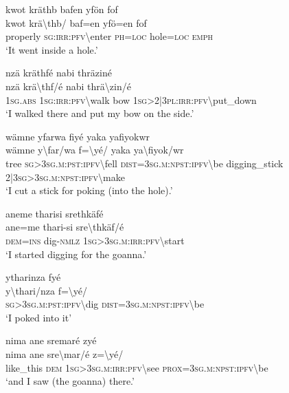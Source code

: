 \ea\label{ex:13:a1312}
kwot kräthb bafen yfön fof\\
\gll kwot	krä{\textbackslash}thb/	baf=en	yfö=en	fof\\
     properly	\textsc{sg}:\textsc{irr}:\textsc{pfv}{\textbackslash}enter	\textsc{ph}=\textsc{loc}	hole=\textsc{loc}	\textsc{emph}\\
\glt `It went inside a hole.'
\z

\ea\label{ex:13:a1313}
nzä kräthfé nabi thräziné\\
\gll nzä	krä{\textbackslash}thf/é	nabi	thrä{\textbackslash}zin/é\\
     1\textsc{sg}.\textsc{abs}	1\textsc{sg}:\textsc{irr}:\textsc{pfv}{\textbackslash}walk	bow	1\textsc{sg}>2|3\textsc{pl}:\textsc{irr}:\textsc{pfv}{\textbackslash}put\_down\\
\glt `I walked there and put my bow on the side.'
\z

\ea\label{ex:13:a1314}
wämne yfarwa fiyé yaka yafiyokwr\\
\gll wämne	y{\textbackslash}far/wa	f={\textbackslash}yé/	yaka	ya{\textbackslash}fiyok/wr\\
     tree	\textsc{sg}>3\textsc{sg}.\textsc{m}:\textsc{pst}:\textsc{ipfv}{\textbackslash}fell	\textsc{dist}=3\textsc{sg}.\textsc{m}:\textsc{npst}:\textsc{ipfv}{\textbackslash}be	digging\_stick	2|3\textsc{sg}>3\textsc{sg}.\textsc{m}:\textsc{npst}:\textsc{ipfv}{\textbackslash}make\\
\glt `I cut a stick for poking (into the hole).'
\z

\ea\label{ex:13:a1315}
aneme tharisi srethkäfé\\
\gll ane=me	thari-si	sre{\textbackslash}thkäf/é\\
     \textsc{dem}=\textsc{ins}	dig-\textsc{nmlz}	1\textsc{sg}>3\textsc{sg}.\textsc{m}:\textsc{irr}:\textsc{pfv}{\textbackslash}start\\
\glt `I started digging for the goanna.'
\z

\ea\label{ex:13:a1316}
ytharinza fyé\\
\gll y{\textbackslash}thari/nza	f={\textbackslash}yé/\\
     \textsc{sg}>3\textsc{sg}.\textsc{m}:\textsc{pst}:\textsc{ipfv}{\textbackslash}dig	\textsc{dist}=3\textsc{sg}.\textsc{m}:\textsc{npst}:\textsc{ipfv}{\textbackslash}be\\
\glt `I poked into it'
\z

\ea\label{ex:13:a1317}
nima ane sremaré zyé\\
\gll nima	ane	sre{\textbackslash}mar/é	z={\textbackslash}yé/\\
     like\_this	\textsc{dem}	1\textsc{sg}>3\textsc{sg}.\textsc{m}:\textsc{irr}:\textsc{pfv}{\textbackslash}see	\textsc{prox}=3\textsc{sg}.\textsc{m}:\textsc{npst}:\textsc{ipfv}{\textbackslash}be\\
\glt `and I saw (the goanna) there.'
\z

